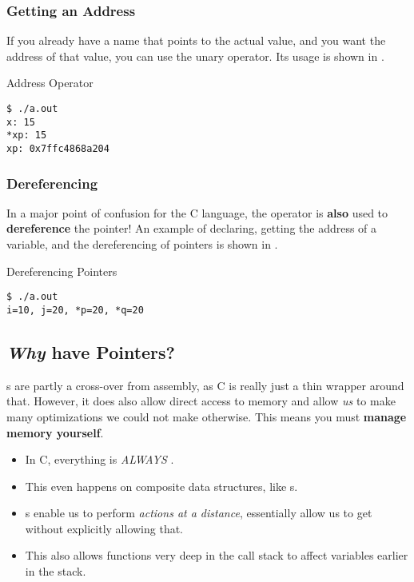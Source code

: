 \subsubsection{Getting an Address}\label{subsubsec:Getting_an_Address}
If you already have a name that points to the actual value, and you want the address of that value, you can use the \cinline{&} unary operator.
Its usage is shown in .
\begin{listing}[h!tbp]
\caption{Address \cinline{&} Operator}
\label{lst:Address_Operator}
\begin{verbatim}
$ ./a.out
x: 15
*xp: 15
xp: 0x7ffc4868a204
\end{verbatim}
\end{listing}

\subsubsection{Dereferencing}\label{subsubsec:Dereferencing_Pointers}
In a major point of confusion for the C language, the \cinline{*} operator is \textbf{also} used to \textbf{dereference} the pointer!
An example of declaring, getting the address of a variable, and the dereferencing of pointers is shown in .
\begin{listing}[h!tbp]
\caption{Dereferencing Pointers}
\label{lst:Dereferencing_Pointers}

\begin{verbatim}
$ ./a.out
i=10, j=20, *p=20, *q=20
\end{verbatim}
\end{listing}

\subsection{\emph{Why} have Pointers?}\label{subsec:Why_Have_Pointers}
s are partly a cross-over from assembly, as C is really just a thin wrapper around that.
However, it does also allow direct access to memory and allow \emph{us} to make many optimizations we could not make otherwise.
This means you must \textbf{manage memory yourself}.

\begin{itemize}
\item In C, everything is \emph{ALWAYS} .
\item This even happens on composite data structures, like s.
\item {}s enable us to perform \emph{actions at a distance}, essentially allow us to get  without explicitly allowing that.
\item This also allows functions very deep in the call stack to affect variables earlier in the stack.
\end{itemize}


